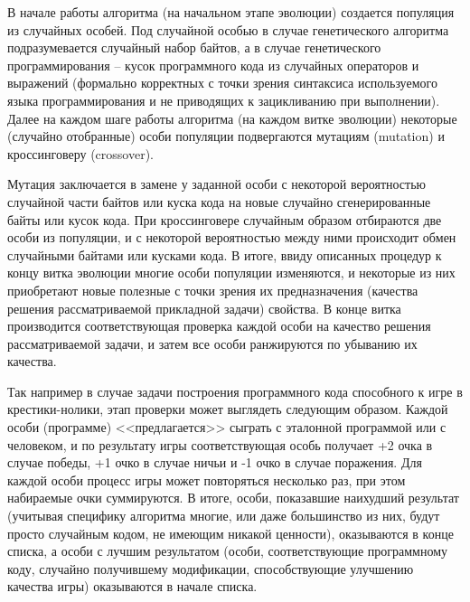 \documentclass[a4paper,12pt,russian]{article} %
\begin{document}
В начале работы алгоритма (на начальном этапе эволюции) создается популяция из случайных особей.
Под случайной особью в случае генетического алгоритма подразумевается случайный набор байтов, а в случае генетического программирования -- кусок программного кода из случайных операторов и выражений (формально корректных с точки зрения синтаксиса используемого языка программирования и не приводящих к зацикливанию при выполнении).
Далее на каждом шаге работы алгоритма (на каждом витке эволюции) некоторые (случайно отобранные) особи популяции подвергаются мутациям (mutation) и кроссинговеру (crossover).

Мутация заключается в замене у заданной особи с некоторой вероятностью случайной части байтов или куска кода на новые случайно сгенерированные байты или кусок кода.
При кроссинговере случайным образом отбираются две особи из популяции, и с некоторой вероятностью между ними происходит обмен случайными байтами или кусками кода.
В итоге, ввиду описанных процедур к концу витка эволюции многие особи популяции изменяются, и некоторые из них приобретают новые полезные с точки зрения их предназначения (качества решения рассматриваемой прикладной задачи) свойства.
В конце витка производится соответствующая проверка каждой особи на качество решения рассматриваемой задачи, и затем все особи ранжируются по убыванию их качества.

Так например в случае задачи построения программного кода способного к игре в крестики-нолики, этап проверки может выглядеть следующим образом.
Каждой особи (программе) <<предлагается>> сыграть с эталонной программой или с человеком, и по результату игры соответствующая особь получает +2 очка в случае победы, +1 очко в случае ничьи и -1 очко в случае поражения.
Для каждой особи процесс игры может повторяться несколько раз, при этом набираемые очки суммируются.
В итоге, особи, показавшие наихудший результат (учитывая специфику алгоритма многие, или даже большинство из них, будут просто случайным кодом, не имеющим никакой ценности), оказываются в конце списка, а особи с лучшим результатом (особи, соответствующие программному коду, случайно получившему модификации, способствующие улучшению качества игры) оказываются в начале списка.
\end{document}
